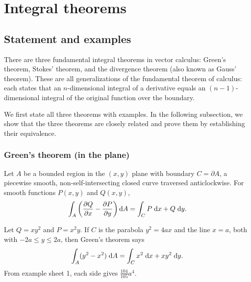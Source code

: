 \documentclass[a4paper]{article}
\begin{document}
\section{Integral theorems}
\subsection{Statement and examples}
\begin{rmk}
  There are three fundamental integral theorems in vector calculus: Green's theorem, Stokes' theorem, and the divergence theorem (also known as Gauss' theorem). These are all generalizations of the fundamental theorem of calculus: each states that an $n$-dimensional integral of a derivative equals an $(n-1)$-dimensional integral of the original function over the boundary.

  We first state all three theorems with examples. In the following subsection, we show that the three theorems are closely related and prove them by establishing their equivalence.
\end{rmk}

\subsubsection{Green's theorem (in the plane)}
\begin{thm}
  Let $A$ be a bounded region in the $(x, y)$ plane with boundary $C = \partial A$, a piecewise smooth, non-self-intersecting closed curve traversed anticlockwise. For smooth functions $P(x, y)$ and $Q(x, y)$,
  \[
    \int_A \left(\frac{\partial Q}{\partial x} - \frac{\partial P}{\partial y}\right)\mathrm{d} A = \int_C P\;\mathrm{d} x + Q\;\mathrm{d} y.
  \]
\end{thm}

\begin{eg}
  Let $Q = xy^2$ and $P = x^2y$. If $C$ is the parabola $y^2 = 4ax$ and the line $x = a$, both with $-2a \leq y \leq 2a$, then Green's theorem says
  \[
    \int_A (y^2 - x^2)\;\mathrm{d} A = \int_C x^2 \;\mathrm{d} x + xy^2\;\mathrm{d} y.
  \]
  From example sheet 1, each side gives $\frac{104}{105} a^4$.
\end{eg}
\end{document}
